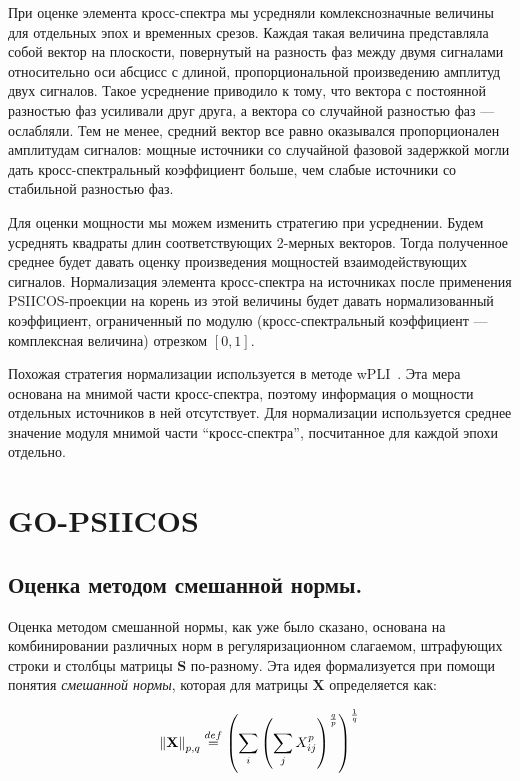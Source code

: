 При оценке элемента кросс-спектра мы усредняли комлекснозначные величины для
отдельных эпох и временных срезов.  Каждая такая величина представляла собой
вектор на плоскости, повернутый на разность фаз между двумя сигналами
относительно оси абсцисс с длиной, пропорциональной произведению амплитуд двух
сигналов.  Такое усреднение приводило к тому, что вектора с постоянной
разностью фаз усиливали друг друга, а вектора со случайной разностью фаз ---
ослабляли. Тем не менее, средний вектор все равно оказывался пропорционален
амплитудам сигналов: мощные источники со случайной фазовой задержкой могли дать
кросс-спектральный коэффициент больше, чем слабые источники со стабильной
разностью фаз.

Для оценки мощности мы можем изменить стратегию при усреднении. Будем усреднять
квадраты длин соответствующих 2-мерных векторов. Тогда полученное среднее
будет давать оценку произведения мощностей взаимодействующих сигналов.
Нормализация элемента кросс-спектра на источниках после применения PSIICOS-проекции
на корень из этой величины будет давать нормализованный коэффициент, ограниченный
по модулю (кросс-спектральный коэффициент --- комплексная величина) отрезком $[0, 1]$.

Похожая стратегия нормализации используется в методе wPLI~\cite{wPLI}.
Эта мера основана на мнимой части кросс-спектра, поэтому информация о мощности
отдельных источников в ней отсутствует. Для нормализации используется
среднее значение модуля мнимой части ``кросс-спектра'', посчитанное для
каждой эпохи отдельно.

\section{GO-PSIICOS}
\subsection{Оценка методом смешанной нормы.}
\label{section_mixed_norm}

Оценка методом смешанной нормы, как уже было сказано, основана на
комбинировании различных норм в регуляризационном слагаемом, штрафующих строки
и столбцы матрицы $\mathbf{S}$ по-разному.  Эта идея формализуется при помощи понятия
\emph{смешанной нормы}, которая для матрицы $\mathbf{X}$ определяется как:

\begin{equation}
    \left\lVert\mathbf{X}\right\rVert_{p,q} \stackrel{def}{=}
    \left(\sum_i \left( \sum_j X_{ij}^p \right)^{\frac{q}{p}}\right)^{\frac{1}{q}}
    \label{mixed_norm_def}
\end{equation}

